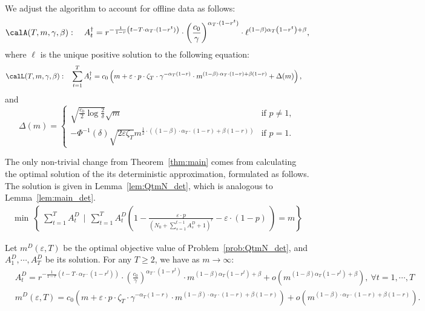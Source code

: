 \documentclass[blindrev]{informs3noheader}
\begin{document}
We adjust the algorithm to account for offline data as follows:
\begin{equation}\label{eq:allocation_QtmN}
\calA(T,m,\gamma,\beta):\quad A^\dagger_t=r^{-\frac{1}{1-r}\left(t-T\cdot\alpha_T\cdot(1-r^t)\right)}\cdot \left(\frac{c_0}{\gamma}\right)^{\alpha_T\cdot(1-r^t)}\cdot \ell^{(1-\beta)\alpha_T\left(1-r^t\right) + \beta},
\end{equation}
where $\ell$ is the unique positive solution to the following equation:
\begin{align*}
\calL(T,m,\gamma,\beta):\quad&\sum_{t=1}^T A^\dagger_t=  c_0 \left(m + \varepsilon\cdot p\cdot\zeta_T\cdot \gamma^{-\alpha_T(1-r)}\cdot m^{(1-\beta)\cdot\alpha_T\cdot(1-r)+\beta(1-r)}+ \Delta(m)\right),
\end{align*}
and
$$\Delta(m) = \begin{cases}
\sqrt{\frac{c_0}{2}\log \frac{2}{\delta}}\sqrt{m} & \text{if }p \neq 1,\\
-\Phi^{-1}(\delta) \sqrt{2\varepsilon \zeta_T} m^{\frac{1}{2}\cdot \left((1-\beta)\cdot\alpha_T\cdot(1-r)+\beta(1-r)\right)}& \text{if }p = 1.\end{cases}$$

The only non-trivial change from Theorem~\ref{thm:main} comes from calculating the optimal solution of the its deterministic approximation, formulated as follows. The solution is given in Lemma~\ref{lem:QtmN_det}, which is analogous to Lemma~\ref{lem:main_det}.
\begin{align}
\min\ \left\{\ \sum_{t=1}^T A^{D}_t \ \ \bigg|\ \ \sum_{t=1}^TA^{D}_t \left(1 - \frac{\varepsilon\cdot p}{\left(N_0+ \sum_{s=1}^{t-1} A^{D}_s +1\right)^r} - \varepsilon\cdot(1-p)\ \right)=m\right\} \label{prob:QtmN_det} \tag{$\calQ^D_T(m,N_0)$}
\end{align}

\begin{lemma}\label{lem:QtmN_det}
Let $m^D(\varepsilon, T)$ be the optimal objective value of Problem~\eqref{prob:QtmN_det}, and $A^{D}_1,\cdots, A^{D}_T$ be its solution. For any $T\geq 2$, we have as $m \to \infty$: 
\begin{align*}
   & A^{D}_t = r^{-\frac{1}{1-r}\left(t-T\cdot\alpha_T\cdot(1-r^t)\right)}\cdot \left(\frac{c_0}{\gamma}\right)^{\alpha_T\cdot(1-r^t)}\cdot m^{(1-\beta)\alpha_T\left(1-r^t\right) + \beta}+o\left(m^{(1-\beta)\alpha_T\left(1-r^t\right) + \beta}\right),\ \forall t=1,\cdots,T\\
   &m^D(\varepsilon, T) = c_0 \left(m + \varepsilon\cdot p\cdot\zeta_T\cdot \gamma^{-\alpha_T(1-r)}\cdot m^{(1-\beta)\cdot\alpha_T\cdot(1-r)+\beta(1-r)}\right)+o\left(m^{(1-\beta)\cdot\alpha_T\cdot(1-r)+\beta(1-r)}\right).
\end{align*}
\end{lemma}
\end{document}
